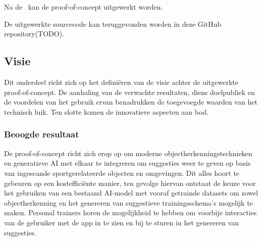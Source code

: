 
\chapter{}
\label{ch:proof-of-concept}
Na de~ kan de proof-of-concept uitgewerkt worden.

De uitgewerkte sourcecode kan teruggevonden worden in deze GitHub repository(TODO). %

\section{Visie}
\label{sec:visie}
Dit onderdeel richt zich op het defini\"eren van de visie achter de uitgewerkte proof-of-concept.
De aanhaling van de verwachte resultaten, diens doelpubliek en de voordelen van het gebruik ervan benadrukken de toegevoegde waarden van het technisch luik.
Ten slotte komen de innovatieve aspecten aan bod.

\subsection{Beoogde resultaat}
\label{subsec:doel-van-de-proof-of-concept}
De proof-of-concept richt zich erop op om moderne objectherkenningstechnieken en generatieve AI met elkaar te integreren om suggesties weer te geven op basis van ingescande sportgerelateerde objecten en omgevingen.
Dit alles hoort te gebeuren op een kosteffici\"ente manier, ten gevolge hiervan ontstaat de keuze voor het gebruiken van een bestaand AI-model met vooraf getrainde datasets om zowel objectherkenning en het genereren van suggestieve trainingsschema's mogelijk te maken.
Personal trainers horen de mogelijkheid te hebben om voorbije interacties van de gebruiker met de app in te zien en bij te sturen in het genereren van suggesties.

